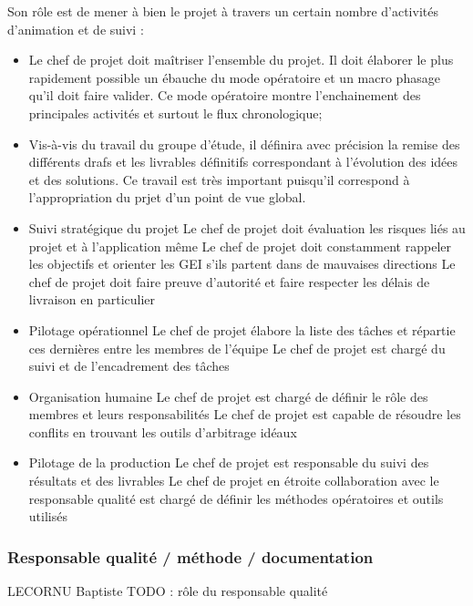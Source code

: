 Son rôle est de mener à bien le projet à travers un certain nombre d'activités d'animation et de suivi :
\begin{itemize}
    \item Le chef de projet doit maîtriser l'ensemble du projet. Il doit élaborer le plus rapidement possible un ébauche
    du mode opératoire et un macro phasage qu'il doit faire valider. Ce mode opératoire montre l'enchainement des principales activités et surtout le flux 
    chronologique;
    \item Vis-à-vis du travail du groupe d'étude, il définira avec précision la remise des différents drafs et les livrables définitifs correspondant
    à l'évolution des idées et des solutions. Ce travail est très important puisqu'il correspond à l'appropriation du prjet d'un point de vue global.    
    \item Suivi stratégique du projet
        \subitem Le chef de projet doit évaluation les risques liés au projet et à l'application même
        \subitem Le chef de projet doit constamment rappeler les objectifs et orienter les GEI s'ils partent dans de mauvaises directions
        \subitem Le chef de projet doit faire preuve d'autorité et faire respecter les délais de livraison en particulier
    \item Pilotage opérationnel
        \subitem Le chef de projet élabore la liste des tâches et répartie ces dernières entre les membres de l'équipe
        \subitem Le chef de projet est chargé du suivi et de l'encadrement des tâches
    \item Organisation humaine
        \subitem Le chef de projet est chargé de définir le rôle des membres et leurs responsabilités
        \subitem Le chef de projet est capable de résoudre les conflits en trouvant les outils d'arbitrage idéaux
    \item Pilotage de la production
        \subitem Le chef de projet est responsable du suivi des résultats et des livrables
        \subitem Le chef de projet en étroite collaboration avec le responsable qualité est chargé de définir les méthodes opératoires et outils utilisés
    
\end{itemize}
\subsubsection{Responsable qualité / méthode / documentation}
LECORNU Baptiste
TODO : rôle du responsable qualité
